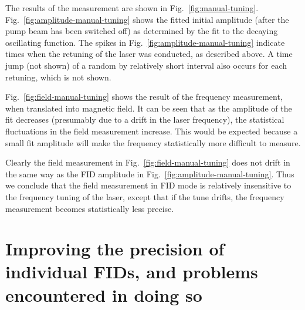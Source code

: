 The results of the measurement are shown in
Fig.~\ref{fig:manual-tuning}.  Fig.~\ref{fig:amplitude-manual-tuning}
shows the fitted initial amplitude (after the pump beam has been
switched off) as determined by the fit to the decaying oscillating
function.  The spikes in Fig.~\ref{fig:amplitude-manual-tuning}
indicate times when the retuning of the laser was conducted, as
described above.  A time jump (not shown) of a random by relatively
short interval also occurs for each retuning, which is not shown.

Fig.~\ref{fig:field-manual-tuning} shows the result of the frequency
measurement, when translated into magnetic field.  It can be seen that
as the amplitude of the fit decreases (presumably due to a drift in
the laser frequency), the statistical fluctuations in the field
measurement increase.  This would be expected because a small fit
amplitude will make the frequency statistically more difficult to
measure.

Clearly the field measurement in Fig.~\ref{fig:field-manual-tuning}
does not drift in the same way as the FID amplitude in
Fig.~\ref{fig:amplitude-manual-tuning}.  Thus we conclude that the
field measurement in FID mode is relatively insensitive to the
frequency tuning of the laser, except that if the tune drifts, the
frequency measurement becomes statistically less precise.



\section{Improving the precision of individual FIDs, and problems encountered in doing so\label{sec:reference-frequency}}

